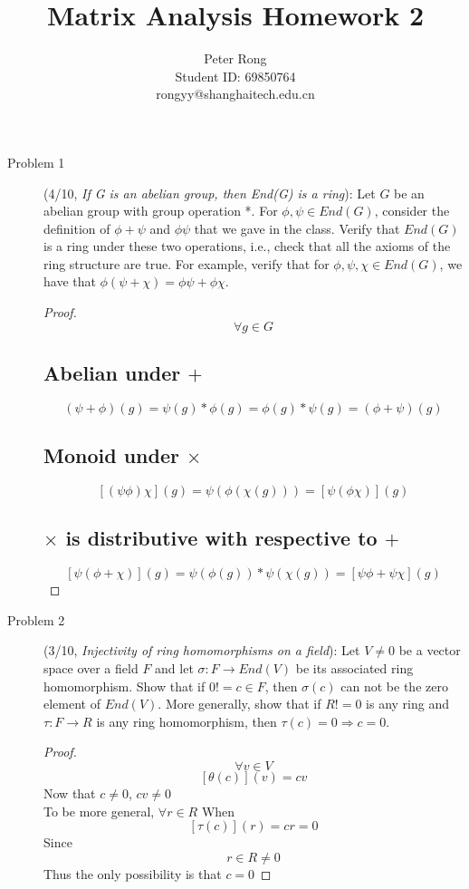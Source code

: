 \documentclass{article}
\title{Matrix Analysis Homework 2}
\author{Peter Rong \\ Student ID: 69850764 \\ rongyy@shanghaitech.edu.cn}
\begin{document}
\maketitle

\begin{description}
	\item[Problem 1](4/10, \textit{If G is an abelian group, then End(G) is a ring}):{
    Let $G$ be an abelian group with group operation *. For $\phi, \psi \in End(G)$, consider the definition of $\phi + \psi $ and $\phi \psi$ that we gave in the class. Verify that $End(G)$ is a ring under these two operations, i.e., check that all the axioms of the ring structure are true. For example, verify that for $\phi, \psi, \chi \in End(G)$, we have that $\phi (\psi + \chi) = \phi \psi + \phi \chi$.}
	\begin{proof}
		$$ \forall g \in G$$
		\subsection*{Abelian under $+$}
			$$(\psi+\phi)(g) 
				= \psi(g) * \phi(g)
				= \phi(g) * \psi(g)
				= (\phi+\psi)(g) 
			$$
		\subsection*{Monoid under $\times$}
			$$ [(\psi\phi)\chi](g)
				= \psi(\phi(\chi(g)))
				= [\psi(\phi\chi)](g)
			$$
		\subsection*{$\times$ is distributive with respective to $+$}
			$$ [\psi(\phi+\chi)](g)
				= \psi(\phi(g)) * \psi(\chi(g))
				= [\psi\phi + \psi\chi](g)
			$$
	\end{proof}

	\item[Problem 2](3/10, \textit{Injectivity of ring homomorphisms on a field}):{
    Let $V \neq 0$ be a vector space over a field $F$ and let $\sigma: F \to End(V)$ be its associated ring homomorphism. Show that if $0 != c \in F$, then $\sigma(c)$ can not be the zero element of $End(V)$. More generally, show that if $R!= 0$ is any ring and $\tau: F \to R$ is any ring homomorphism, then $\tau(c) = 0 \Rightarrow c = 0$.}

	\begin{proof}
	
		$$ \forall v \in V $$
		$$ [\theta(c)](v) = cv $$
		Now that $ c \neq 0$, $cv \neq 0$ \\
		To be more general, $ \forall r \in R$
		When $$ [\tau(c)](r) = cr = 0 $$ 
		Since $$ r \in R \neq 0 $$
		Thus the only possibility is that $ c = 0 $



\end{proof}
\end{description}
\end{document}
